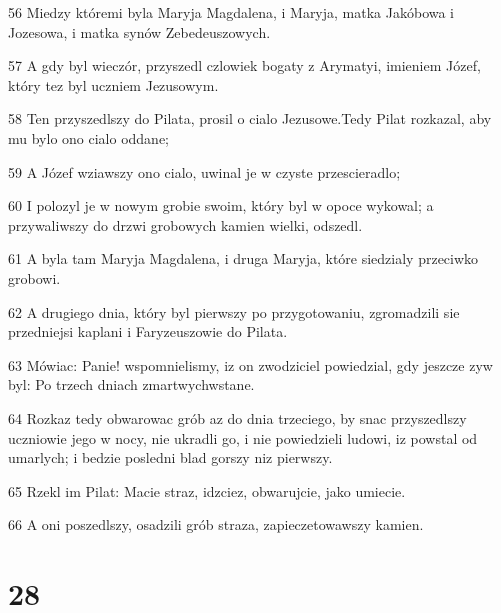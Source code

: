 \par 56 Miedzy któremi byla Maryja Magdalena, i Maryja, matka Jakóbowa i Jozesowa, i matka synów Zebedeuszowych.
\par 57 A gdy byl wieczór, przyszedl czlowiek bogaty z Arymatyi, imieniem Józef, który tez byl uczniem Jezusowym.
\par 58 Ten przyszedlszy do Pilata, prosil o cialo Jezusowe.Tedy Pilat rozkazal, aby mu bylo ono cialo oddane;
\par 59 A Józef wziawszy ono cialo, uwinal je w czyste przescieradlo;
\par 60 I polozyl je w nowym grobie swoim, który byl w opoce wykowal; a przywaliwszy do drzwi grobowych kamien wielki, odszedl.
\par 61 A byla tam Maryja Magdalena, i druga Maryja, które siedzialy przeciwko grobowi.
\par 62 A drugiego dnia, który byl pierwszy po przygotowaniu, zgromadzili sie przedniejsi kaplani i Faryzeuszowie do Pilata.
\par 63 Mówiac: Panie! wspomnielismy, iz on zwodziciel powiedzial, gdy jeszcze zyw byl: Po trzech dniach zmartwychwstane.
\par 64 Rozkaz tedy obwarowac grób az do dnia trzeciego, by snac przyszedlszy uczniowie jego w nocy, nie ukradli go, i nie powiedzieli ludowi, iz powstal od umarlych; i bedzie posledni blad gorszy niz pierwszy.
\par 65 Rzekl im Pilat: Macie straz, idzciez, obwarujcie, jako umiecie.
\par 66 A oni poszedlszy, osadzili grób straza, zapieczetowawszy kamien.

\chapter{28}

